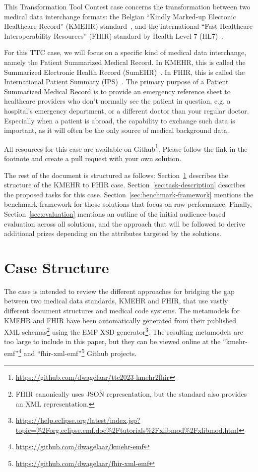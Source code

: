\documentclass[
twocolumn,
]{ceurart}
\begin{document}
This Transformation Tool Contest case concerns the transformation between two
medical data interchange formats: the Belgian ``Kindly Marked-up Electonic
Healthcare Record'' (KMEHR) standard~\cite{kmehr_2023}, and the international
``Fast Healthcare Interoperability Resources'' (FHIR) standard by Health Level
7 (HL7)~\cite{fhir_2023}.

For this TTC case, we will focus on a specific kind of medical data 
interchange, namely the Patient Summarized Medical Record. In KMEHR, this is 
called the Summarized Electronic Health Record (SumEHR)~\cite{sumehr_2016}.
In FHIR, this is called the International Patient Summary
(IPS)~\cite{fhirips_2022}. The primary purpose of a Patient Summarized Medical
Record is to provide an emergency reference sheet to healthcare providers who 
don't normally see the patient in question, e.g. a hospital's emergency 
department, or a different doctor than your regular doctor.
Especially when a patient is abroad, the capability to exchange 
such data is important, as it will often be the only source of medical 
background data.

All resources for this case are available on
Github\footnote{\url{https://github.com/dwagelaar/ttc2023-kmehr2fhir}}.
Please follow the link in the footnote and create a pull request with your own
solution.

The rest of the document is structured as follows:
Section~\ref{sec:case-structure} describes the structure of the KMEHR to FHIR 
case. Section~\ref{sec:task-description} describes the proposed tasks for this
case. Section~\ref{sec:benchmark-framework} mentions the benchmark framework for
those solutions that focus on raw performance. Finally,
Section~\ref{sec:evaluation} mentions an outline of the initial audience-based
evaluation across all solutions, and the approach that will be followed to
derive additional prizes depending on the attributes targeted by the solutions.

\section{Case Structure}
\label{sec:case-structure}

The case is intended to review the different approaches for bridging the gap
between two medical data standards, KMEHR and FHIR, that use vastly different
document structures and medical code systems. The metamodels for
KMEHR and FHIR have been automatically generated from their published XML 
schemas\footnote{FHIR canonically uses JSON
representation, but the standard also provides an XML representation.}
using the EMF XSD generator\footnote{\url{https://help.eclipse.org/latest/index.jsp?topic=\%2Forg.eclipse.emf.doc\%2Ftutorials\%2Fxlibmod\%2Fxlibmod.html}}. The
resulting metamodels are too large to include in this paper, but they can
be viewed online at the
``kmehr-emf''\footnote{\url{https://github.com/dwagelaar/kmehr-emf}} and
``fhir-xml-emf''\footnote{\url{https://github.com/dwagelaar/fhir-xml-emf}}
Github projects.
\end{document}
